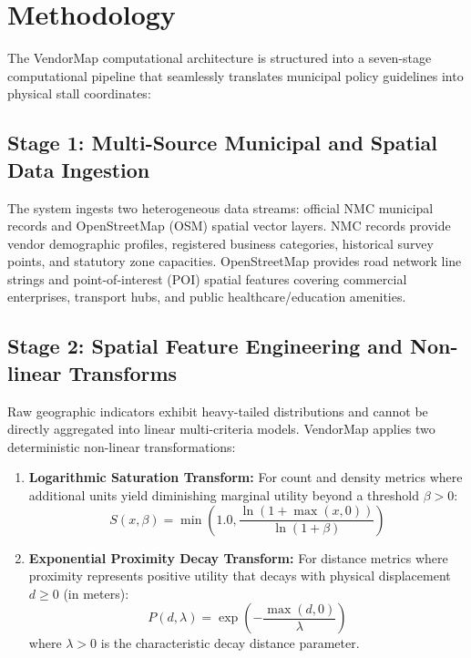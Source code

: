 \section{Methodology}
\label{sec:methodology}

The VendorMap computational architecture is structured into a seven-stage computational pipeline that seamlessly translates municipal policy guidelines into physical stall coordinates:

\subsection{Stage 1: Multi-Source Municipal and Spatial Data Ingestion}
The system ingests two heterogeneous data streams: official NMC municipal records and OpenStreetMap (OSM) spatial vector layers. NMC records provide vendor demographic profiles, registered business categories, historical survey points, and statutory zone capacities. OpenStreetMap provides road network line strings and point-of-interest (POI) spatial features covering commercial enterprises, transport hubs, and public healthcare/education amenities.

\subsection{Stage 2: Spatial Feature Engineering and Non-linear Transforms}
Raw geographic indicators exhibit heavy-tailed distributions and cannot be directly aggregated into linear multi-criteria models. VendorMap applies two deterministic non-linear transformations:
\begin{enumerate}
    \item \textbf{Logarithmic Saturation Transform:} For count and density metrics where additional units yield diminishing marginal utility beyond a threshold $\beta > 0$:
    \begin{equation}
        S(x, \beta) = \min\left(1.0, \frac{\ln(1 + \max(x, 0))}{\ln(1 + \beta)}\right)
        \label{eq:sat_transform}
    \end{equation}
    \item \textbf{Exponential Proximity Decay Transform:} For distance metrics where proximity represents positive utility that decays with physical displacement $d \ge 0$ (in meters):
    \begin{equation}
        P(d, \lambda) = \exp\left( -\frac{\max(d, 0)}{\lambda} \right)
        \label{eq:prox_transform}
    \end{equation}
    where $\lambda > 0$ is the characteristic decay distance parameter.
\end{enumerate}

